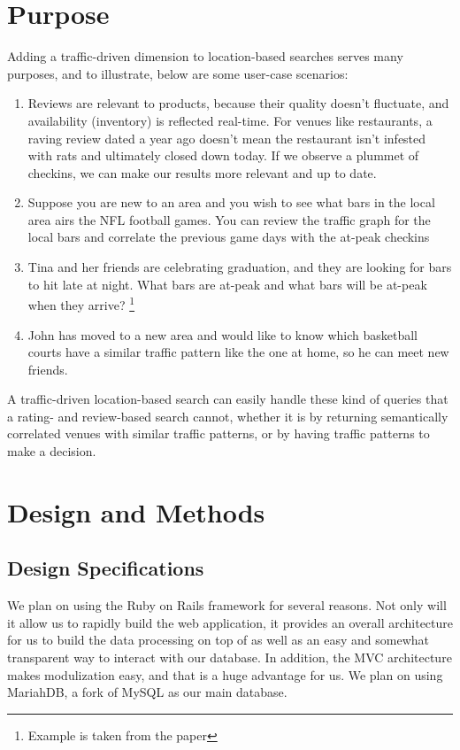 \documentclass{article}
\begin{document}
\section{Purpose}
Adding a traffic-driven dimension to location-based searches serves many purposes, and to illustrate, below
are some user-case scenarios:
\begin{enumerate}
\item Reviews are relevant to products, because their quality doesn't fluctuate, and availability (inventory) is
reflected real-time. For venues like restaurants, a raving review dated a year ago doesn't mean the restaurant
isn't infested with rats and ultimately closed down today. If we observe a plummet of checkins, we can
make our results more relevant and up to date. 
\item Suppose you are new to an area and you wish to see what bars in the local area airs the NFL football games.
You can review the traffic graph for the local bars and correlate the previous game days with the at-peak checkins
\item Tina and her friends are celebrating graduation, and they are looking for bars to hit late at night. What bars
are at-peak and what bars will be at-peak when they arrive? \footnote{Example is taken from the paper}
\item John has moved to a new area and would like to know which basketball courts have a similar traffic pattern
like the one at home, so he can meet new friends. \footnotemark[\value{footnote}]
\end{enumerate}
A traffic-driven location-based search can easily handle these kind of queries that a rating- and review-based
search cannot, whether it is by returning semantically correlated venues with similar traffic patterns, or by
having traffic patterns to make a decision.

\section{Design and Methods}
\subsection{Design Specifications}
We plan on using the Ruby on Rails framework for several reasons. Not only will it allow us
to rapidly build the web application, it provides an overall architecture for us to build the data processing
on top of as well as an easy and somewhat transparent way to interact with our database. In addition, the MVC
architecture makes modulization easy, and that is a huge advantage for us. We plan on using
MariahDB, a fork of MySQL as our main database.
\end{document}
